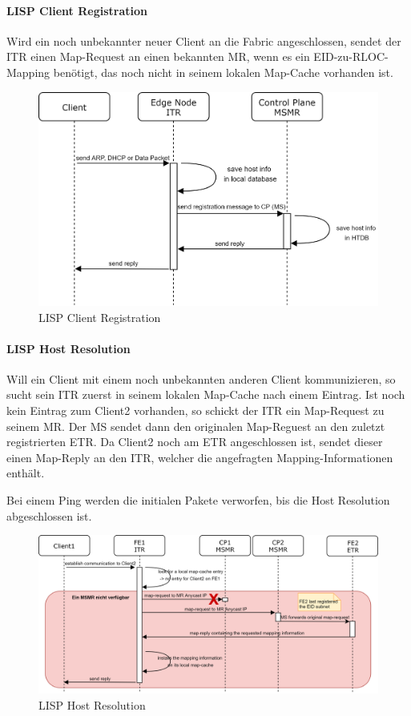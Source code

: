 \paragraph{LISP Client Registration}
Wird ein noch unbekannter neuer Client an die Fabric angeschlossen, sendet der ITR einen Map-Request an einen bekannten MR, wenn es ein EID-zu-RLOC-Mapping benötigt, das noch nicht in seinem lokalen Map-Cache vorhanden ist.

\begin{figure}[H]
	\centering
	\includegraphics[width=0.8\linewidth]{img/Absicherung/LISP-ClientRegistration}
	\caption{LISP Client Registration}
	\label{fig:LISP Client Registration}
\end{figure}

\paragraph{LISP Host Resolution}
Will ein Client mit einem noch unbekannten anderen Client kommunizieren, so sucht sein ITR zuerst in seinem lokalen Map-Cache nach einem Eintrag. Ist noch kein Eintrag zum Client2 vorhanden, so schickt der ITR ein Map-Request zu seinem MR. Der MS sendet dann den originalen Map-Reguest an den zuletzt registrierten ETR. Da Client2 noch am ETR angeschlossen ist, sendet dieser einen Map-Reply an den ITR, welcher die angefragten Mapping-Informationen enthält.

Bei einem Ping werden die initialen Pakete verworfen, bis die Host Resolution abgeschlossen ist. 

\begin{figure}[H]
	\centering
	\includegraphics[width=1\linewidth]{img/Absicherung/LISP-HostResolution-Fail}
	\caption{LISP Host Resolution}
	\label{fig:LISP Host Resolution}
\end{figure}

